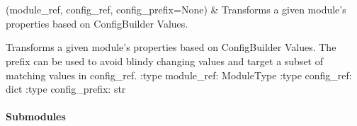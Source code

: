 \documentclass[letterpaper,10pt,english]{sphinxmanual}
\begin{document}
\begin{savenotes}\sphinxatlongtablestart\begin{longtable}[c]{}
\hline

\endfirsthead

%
{}\\
\hline

\endhead

\hline
{}\\
\endfoot

\endlastfoot

\sphinxAtStartPar
{\hyperref[\detokenize{autoapi/pine/backend/shared/transform/index:pine.backend.shared.transform.transform_module_by_config}]{}}(module\_ref, config\_ref, config\_prefix=None)
&
\sphinxAtStartPar
Transforms a given module’s properties based on ConfigBuilder Values.
\\
\hline
\end{longtable}\sphinxatlongtableend\end{savenotes}

\begin{fulllineitems}
\label{\detokenize{autoapi/pine/backend/shared/transform/index:pine.backend.shared.transform.transform_module_by_config}}
\sphinxAtStartPar
Transforms a given module’s properties based on ConfigBuilder Values.
The prefix can be used to avoid blindy changing values and target a subset of matching values in config\_ref.
:type module\_ref: ModuleType
:type config\_ref: dict
:type config\_prefix: str

\end{fulllineitems}



\paragraph{Submodules}
\label{\detokenize{autoapi/pine/backend/index:submodules}}
\end{document}
